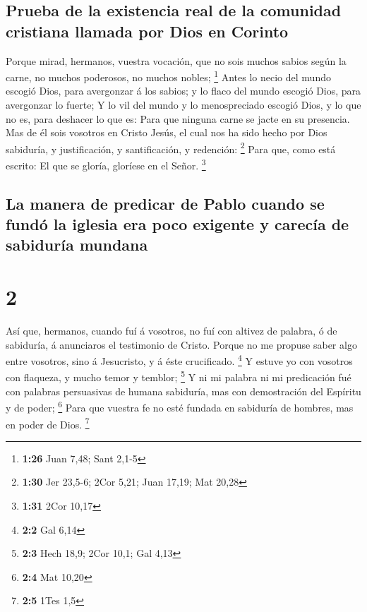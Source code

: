 \hypertarget{prueba-de-la-existencia-real-de-la-comunidad-cristiana-llamada-por-dios-en-corinto}{%
\subsection{Prueba de la existencia real de la comunidad cristiana
llamada por Dios en
Corinto}\label{prueba-de-la-existencia-real-de-la-comunidad-cristiana-llamada-por-dios-en-corinto}}

 Porque mirad, hermanos, vuestra vocación, que no sois
muchos sabios según la carne, no muchos poderosos, no muchos nobles;
\footnote{\textbf{1:26} Juan 7,48; Sant 2,1-5}  Antes lo
necio del mundo escogió Dios, para avergonzar á los sabios; y lo flaco
del mundo escogió Dios, para avergonzar lo fuerte;  Y lo
vil del mundo y lo menospreciado escogió Dios, y lo que no es, para
deshacer lo que es:  Para que ninguna carne se jacte en su
presencia.  Mas de él sois vosotros en Cristo Jesús, el
cual nos ha sido hecho por Dios sabiduría, y justificación, y
santificación, y redención: \footnote{\textbf{1:30} Jer 23,5-6; 2Cor
  5,21; Juan 17,19; Mat 20,28}  Para que, como está
escrito: El que se gloría, gloríese en el Señor. \footnote{\textbf{1:31}
  2Cor 10,17}

\hypertarget{la-manera-de-predicar-de-pablo-cuando-se-funduxf3-la-iglesia-era-poco-exigente-y-carecuxeda-de-sabiduruxeda-mundana}{%
\subsection{La manera de predicar de Pablo cuando se fundó la iglesia
era poco exigente y carecía de sabiduría
mundana}\label{la-manera-de-predicar-de-pablo-cuando-se-funduxf3-la-iglesia-era-poco-exigente-y-carecuxeda-de-sabiduruxeda-mundana}}

\hypertarget{section-1}{%
\section{2}\label{section-1}}

 Así que, hermanos, cuando fuí á vosotros, no fuí con
altivez de palabra, ó de sabiduría, á anunciaros el testimonio de
Cristo.  Porque no me propuse saber algo entre vosotros,
sino á Jesucristo, y á éste crucificado. \footnote{\textbf{2:2} Gal 6,14}
 Y estuve yo con vosotros con flaqueza, y mucho temor y
temblor; \footnote{\textbf{2:3} Hech 18,9; 2Cor 10,1; Gal 4,13}
 Y ni mi palabra ni mi predicación fué con palabras
persuasivas de humana sabiduría, mas con demostración del Espíritu y de
poder; \footnote{\textbf{2:4} Mat 10,20}  Para que vuestra
fe no esté fundada en sabiduría de hombres, mas en poder de Dios.
\footnote{\textbf{2:5} 1Tes 1,5}

